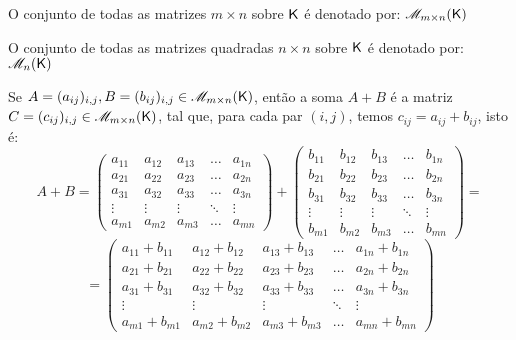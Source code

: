 \documentclass[10pt,a4paper]{book}
\begin{document}
\begin{definition}
	O conjunto de todas as matrizes $m \times n$ sobre $\mathsf{ K }$ é denotado por: $\mathscr{ M }_{m \times n}(\mathsf{ K })$
\end{definition}


\begin{definition}
	O conjunto de todas as matrizes quadradas $n \times n$ sobre $\mathsf{ K }$ é denotado por: $\mathscr{ M }_{n}(\mathsf{ K })$
\end{definition}


\begin{definition} 
	Se $A = (a_{ij})_{i,j}, B = (b_{ij})_{i,j} \in \mathscr{ M }_{m \times n}(\mathsf{ K })$, então a soma $A + B$ é a matriz $C  = (c_{ij})_{i,j} \in \mathscr{ M }_{m \times n}(\mathsf{ K })$, tal que, para cada par $(i, j)$, temos $c_{ij} = a_{ij} + b_{ij}$, isto é:
	\[
		A + B = 
		\left(\begin{array}{ccccc}
			a_{11} & a_{12} & a_{13} &  \dots & a_{1n} \\
			a_{21} & a_{22} & a_{23} &  \dots & a_{2n} \\
			a_{31} & a_{32} & a_{33} &  \dots & a_{3n} \\
			\vdots & \vdots & \vdots & \ddots & \vdots \\
			a_{m1} & a_{m2} & a_{m3} &  \dots & a_{mn} 
		\end{array}\right)
		+
		\left(\begin{array}{ccccc}
			b_{11} & b_{12} & b_{13} &  \dots & b_{1n} \\
			b_{21} & b_{22} & b_{23} &  \dots & b_{2n} \\
			b_{31} & b_{32} & b_{33} &  \dots & b_{3n} \\
			\vdots & \vdots & \vdots & \ddots & \vdots \\
			b_{m1} & b_{m2} & b_{m3} &  \dots & b_{mn} 
		\end{array}\right)
		=
	\]
	\[
		= \left(\begin{array}{ccccc}
			a_{11} + b_{11} & a_{12} + b_{12} & a_{13} + b_{13} &  \dots & a_{1n} + b_{1n} \\
			a_{21} + b_{21} & a_{22} + b_{22} & a_{23} + b_{23} &  \dots & a_{2n} + b_{2n} \\
			a_{31} + b_{31} & a_{32} + b_{32} & a_{33} + b_{33} &  \dots & a_{3n} + b_{3n} \\
			\vdots          & \vdots          & \vdots          & \ddots & \vdots          \\
			a_{m1} + b_{m1} & a_{m2} + b_{m2} & a_{m3} + b_{m3} &  \dots & a_{mn} + b_{mn} 
		\end{array}\right)
	\]
\end{definition}
\end{document}
